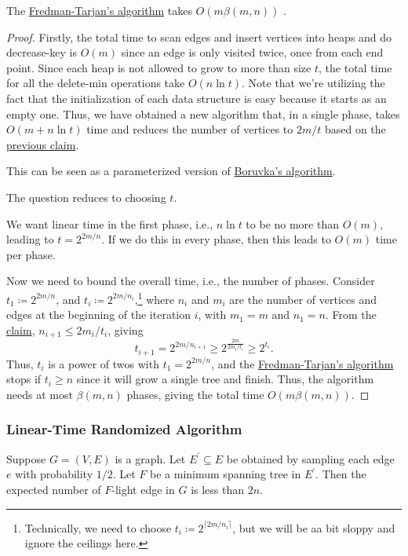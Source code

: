 \begin{theorem}\label{thm:Fredman-Tarjan}
	The \hyperref[algo:Fredman-Tarjan]{Fredman-Tarjan's algorithm} takes \(O(m \beta (m, n))\) .
\end{theorem}
\begin{proof}
	Firstly, the total time to scan edges and insert vertices into heaps and do decrease-key is \(O(m)\) since an edge is only visited twice, once from each end point. Since each heap is not allowed to grow to more than size \(t\), the total time for all the delete-min operations take \(O(n \ln t)\). Note that we're utilizing the fact that the initialization of each data structure is easy because it starts as an empty one. Thus, we have obtained a new algorithm that, in a single phase, takes \(O(m + n \ln t)\) time and reduces the number of vertices to \(2m / t\) based on the \hyperref[clm:Fredman-Tarjan]{previous claim}.

	\begin{note}
		This can be seen as a parameterized version of \hyperref[algo:Boruvka]{Boruvka's algorithm}.
	\end{note}

	The question reduces to choosing \(t\).

	\begin{intuition}
		We want linear time in the first phase, i.e., \(n \ln t\) to be no more than \(O(m)\), leading to \(t = 2^{2m / n}\). If we do this in every phase, then this leads to \(O(m)\) time per phase.
	\end{intuition}

	Now we need to bound the overall time, i.e., the number of phases. Consider \(t_1 \coloneqq 2^{2m / n}\), and \(t_i \coloneqq 2^{2m / n_i}\),\footnote{Technically, we need to choose \(t_i \coloneqq 2^{\lceil 2m / n_i \rceil }\), but we will be aa bit sloppy and ignore the ceilings here.} where \(n_i\) and \(m_i\) are the number of vertices and edges at the beginning of the iteration \(i\), with \(m_1 = m\) and \(n_1 = n\). From the \hyperref[clm:Fredman-Tarjan]{claim}, \(n_{i+1} \leq 2m_i / t_i\), giving
	\[
		t_{i+1}
		= 2^{2m / n_{i+1}}
		\geq 2^{\frac{2m}{2m_i / t_i}}
		\geq 2^{t_i}.
	\]
	Thus, \(t_i\) is a power of twos with \(t_1 = 2^{2m / n}\), and the \hyperref[algo:Fredman-Tarjan]{Fredman-Tarjan's algorithm} stops if \(t_i \geq n\) since it will grow a single tree and finish. Thus, the algorithm needs at most \(\beta (m, n)\) phases, giving the total time \(O(m \beta (m, n))\).
\end{proof}

\subsubsection{Linear-Time Randomized Algorithm}

\begin{lemma}\label{lma:sampling}
	Suppose \(G=(V, E)\) is a graph. Let \(E^{\prime} \subseteq E\) be obtained by sampling each edge \(e\) with probability \(1 / 2\). Let \(F\) be a minimum spanning tree in \(E^{\prime} \). Then the expected number of \(F\)-light edge in \(G\) is less than \(2n\).
\end{lemma}